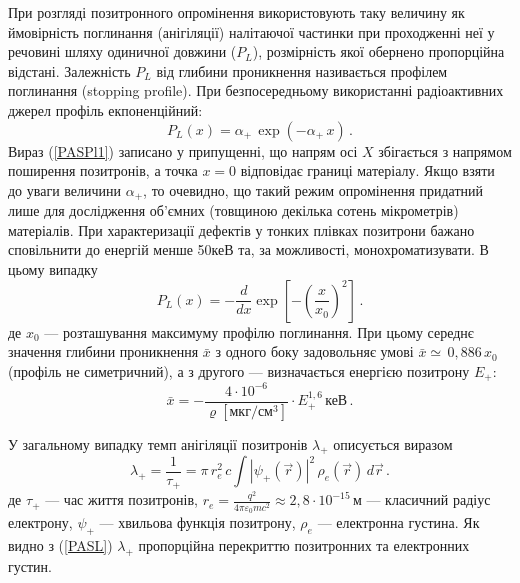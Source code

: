\documentclass[10pt,a5paper,titlepage,oneside]{book}
\numberwithin{equation}{part}
\begin{document}
При розгляді позитронного опромінення використовують
таку величину як ймовірність поглинання (анігіляції) налітаючої частинки
при проходженні неї у речовині шляху одиничної довжини ($P_L$),
розмірність якої обернено пропорційна відстані.
Залежність $P_L$ від глибини проникнення називається профілем поглинання (stopping profile).
При безпосередньому використанні радіоактивних джерел профіль екпоненційний:
\begin{equation}\label{PASPl1}
P_L(x)=\alpha_+\,\exp(-\alpha_+\,x)\,.
\end{equation}
Вираз (\ref{PASPl1}) записано у припущенні, що
напрям осі $X$ збігається з напрямом поширення позитронів,
а точка $x=0$ відповідає границі матеріалу.
Якщо взяти до уваги величини $\alpha_+$, то очевидно,
що такий режим опромінення придатний лише для дослідження об'ємних
(товщиною декілька сотень мікрометрів) матеріалів.
При характеризації дефектів у тонких плівках позитрони
бажано сповільнити до енергій менше 50кеВ та, за можливості, монохроматизувати.
В цьому випадку
\begin{equation}\label{PASPl2}
P_L(x)=-\frac{d}{dx}\exp\left[-\left(\frac{x}{x_0}\right)^2\right]\,.
\end{equation}
де
$x_0$ --- розташування максимуму профілю поглинання.
При цьому середнє значення глибини проникнення $\bar{x}$  з одного боку
задовольняє умові $\bar{x}\simeq \,0,886\, x_0$ (профіль не симетричний),
а з другого --- визначається енергією позитрону $E_{+}$:
\begin{equation}
\bar{x}=-\frac{4\cdot10^{-6}}{\varrho\left[\text{мкг}/\text{см}^3\right]}\cdot E_{+}^{1,6}\,\text{кеВ}\,.
\end{equation}

У загальному випадку темп анігіляції позитронів $\lambda_+$ описується виразом
\begin{equation}\label{PASL}
\lambda_+=\frac{1}{\tau_+}=\pi\,r_e^2\,c\int\left|\psi_+(\overrightarrow{r})\right|^2\,\rho_e(\overrightarrow{r})\,d\overrightarrow{r}\,.
\end{equation}
де
$\tau_+$ --- час життя позитронів,
$r_e=\frac{q^2}{4\pi\varepsilon_0 m c^2}\approx2,8\cdot10^{-15}\,\text{м}$ --- класичний радіус електрону,
$\psi_+$ --- хвильова функція позитрону,
$\rho_e$ --- електронна густина.
Як видно з (\ref{PASL})  $\lambda_+$ пропорційна перекриттю позитронних та електронних густин.
\end{document}
